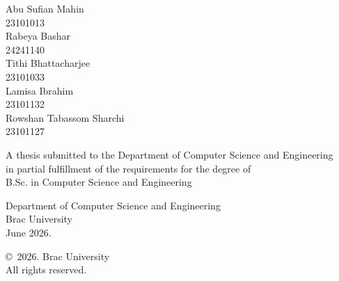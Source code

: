 \begin{titlepage}
\renewcommand*{\thepage}{Title} %

    \begin{center} 
        \vspace*{3cm} %
        
        {\fontsize{16pt}{22pt}\selectfont{Multi-Modal Deep Learning for Robust Ship Detection and Vessel Trajectory Tracking}
        } %
        
        \vspace{1.5cm}
        
        
        \vspace{0.5cm}
        
        	Abu Sufian Mahin\\
	        23101013\\
            Rabeya Bashar\\
	        24241140\\
            Tithi Bhattacharjee\\
            23101033\\
	        Lamisa Ibrahim\\
	        23101132\\
	        Rowshan Tabassom Sharchi\\
	        23101127\\
	        

        \vspace{1.5cm}
        
        	A thesis submitted to the Department of Computer Science and Engineering\\
            in partial fulfillment of the requirements for the degree of\\
            B.Sc. in Computer Science and Engineering

        
        \vspace{2.5cm}
        
    		Department of Computer Science and Engineering\\
            Brac University\\
            June 2026.
        
        \vspace{3cm}
        
    		\copyright\ 2026. Brac University\\
            All rights reserved.
    
    \end{center}

\end{titlepage}